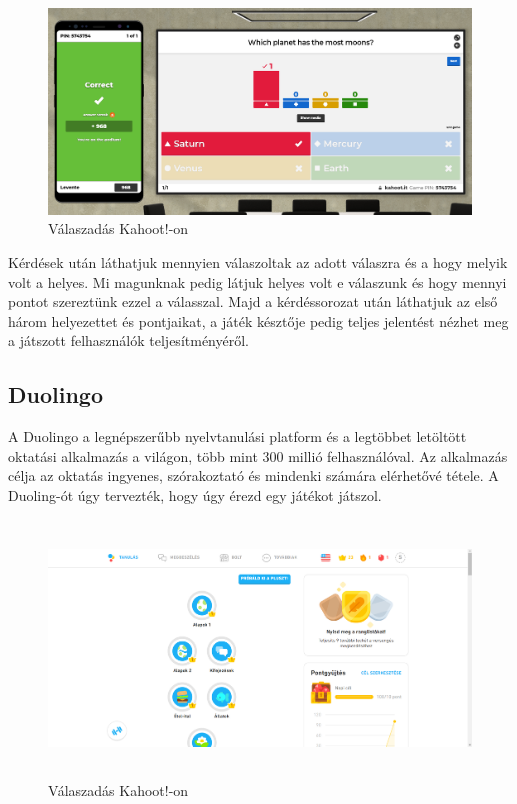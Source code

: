 \begin{figure}[h]
  \centering
  \includegraphics[width=\textwidth]{images/kahoot_play2.png}
  \caption{Válaszadás Kahoot!-on}
\end{figure}
Kérdések után láthatjuk mennyien válaszoltak az adott válaszra és a hogy melyik volt a helyes. Mi magunknak pedig látjuk helyes volt e válaszunk és hogy mennyi pontot szereztünk ezzel a válasszal. Majd a kérdéssorozat után láthatjuk az első három helyezettet és pontjaikat, a játék késztője pedig teljes jelentést nézhet meg a játszott felhasználók teljesítményéről.

\subsection{Duolingo}
A Duolingo a legnépszerűbb nyelvtanulási platform és a legtöbbet letöltött oktatási alkalmazás a világon, több mint 300 millió felhasználóval. Az alkalmazás célja az oktatás ingyenes, szórakoztató és mindenki számára elérhetővé tétele. A Duoling-ót úgy tervezték, hogy úgy érezd egy játékot játszol.\cite{whatIsDuolingo}


\begin{figure}[h]
  \centering
  \includegraphics[height=6.8cm]{images/Duolingo_main_page.png}
  \caption{Válaszadás Kahoot!-on}
\end{figure}

